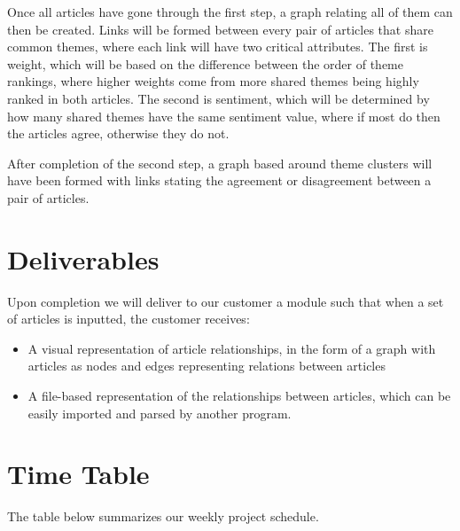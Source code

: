 \documentclass[12pt]{article}
\begin{document}
Once all articles have gone through the first step, a graph relating all of them can then be created.  Links will be formed between every pair of articles that share common themes, where each link will have two critical attributes.  The first is weight, which will be based on the difference between the order of theme rankings, where higher weights come from more shared themes being highly ranked in both articles.  The second is sentiment, which will be determined by how many shared themes have the same sentiment value, where if most do then the articles agree, otherwise they do not.  

After completion of the second step, a graph based around theme clusters will have been formed with links stating the agreement or disagreement between a pair of articles.

\section{Deliverables}
Upon completion we will deliver to our customer a module such that when a set of articles is inputted, the customer receives:
\begin{itemize}
\item A visual representation of article relationships, in the form of a graph with articles as nodes and edges representing relations between articles

\item A file-based representation of the relationships between articles, which can be easily imported and parsed by another program.

\end{itemize}

\section{Time Table}
The table below summarizes our weekly project schedule.
\end{document}
